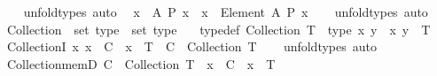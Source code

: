 \begin{isabellebody}
%
\isadelimproof
\ \ %
\endisadelimproof
%
\isatagproof
{}\isamarkupfalse%
\ unfold{\isacharunderscore}{\kern0pt}types\ auto%
\endisatagproof
{\isafoldproof}%
%
\isadelimproof
\isanewline
%
\endisadelimproof
\isanewline
{}\isamarkupfalse%
\isanewline
\ \ {\isachardoublequoteopen}{\isasymexists}x\ {\isasymin}\ A{\isachardot}{\kern0pt}\ P\ x{\isachardoublequoteclose}\ {\isasymrightleftharpoons}\ {\isachardoublequoteopen}{\isasymexists}x\ {\isacharcolon}{\kern0pt}\ Element\ A{\isachardot}{\kern0pt}\ P\ x{\isachardoublequoteclose}\isanewline
%
\isadelimproof
\ \ %
\endisadelimproof
%
\isatagproof
{}\isamarkupfalse%
\ unfold{\isacharunderscore}{\kern0pt}types\ auto%
\endisatagproof
{\isafoldproof}%
%
\isadelimproof
%
\endisadelimproof
%
\isadelimdocument
%
\endisadelimdocument
%
\isatagdocument
%
\isamarkuptrue%
%
\endisatagdocument
{\isafolddocument}%
%
\isadelimdocument
%
\endisadelimdocument
{}\isamarkupfalse%
\ Collection\ {\isacharcolon}{\kern0pt}{\isacharcolon}{\kern0pt}\ {\isachardoublequoteopen}set\ type\ {\isasymRightarrow}\ set\ type{\isachardoublequoteclose}\isanewline
\ \ \ {\isacharbrackleft}{\kern0pt}typedef{\isacharbrackright}{\kern0pt}{\isacharcolon}{\kern0pt}\ {\isachardoublequoteopen}Collection\ T\ {\isasymequiv}\ type\ {\isacharparenleft}{\kern0pt}{\isasymlambda}x{\isachardot}{\kern0pt}\ {\isasymforall}y\ {\isasymin}\ x{\isachardot}{\kern0pt}\ y\ {\isacharcolon}{\kern0pt}\ T{\isacharparenright}{\kern0pt}{\isachardoublequoteclose}\isanewline
\isanewline
{}\isamarkupfalse%
\ CollectionI{\isacharcolon}{\kern0pt}\ {\isachardoublequoteopen}{\isacharparenleft}{\kern0pt}{\isasymAnd}x{\isachardot}{\kern0pt}\ x\ {\isasymin}\ C\ {\isasymLongrightarrow}\ x\ {\isacharcolon}{\kern0pt}\ T{\isacharparenright}{\kern0pt}\ {\isasymLongrightarrow}\ C\ {\isacharcolon}{\kern0pt}\ Collection\ T{\isachardoublequoteclose}\isanewline
%
\isadelimproof
\ \ %
\endisadelimproof
%
\isatagproof
{}\isamarkupfalse%
\ unfold{\isacharunderscore}{\kern0pt}types\ auto%
\endisatagproof
{\isafoldproof}%
%
\isadelimproof
\isanewline
%
\endisadelimproof
\isanewline
{}\isamarkupfalse%
\ Collection{\isacharunderscore}{\kern0pt}memD{\isacharcolon}{\kern0pt}\ {\isachardoublequoteopen}C\ {\isacharcolon}{\kern0pt}\ Collection\ T\ {\isasymLongrightarrow}\ x\ {\isasymin}\ C\ {\isasymLongrightarrow}\ x\ {\isacharcolon}{\kern0pt}\ T{\isachardoublequoteclose}\isanewline

\end{isabellebody}
